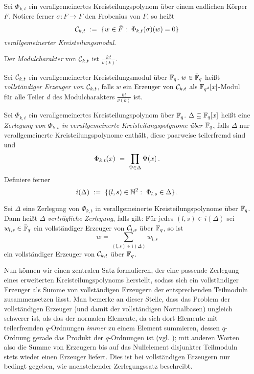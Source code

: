 \begin{definition}
  \label{def:verallgemeinerter_kreisteilungsmodul}
  Sei $\Phi_{k,t}$ ein verallgemeinertes Kreisteilungspolynom über einem
  endlichen Körper $F$. Notiere ferner $\sigma: \bar F\to \bar F$ 
  den Frobenius von $F$, so heißt
  \[ \mathcal{C}_{k,t} \ :=\  \{ w \in \bar F:\ \Phi_{k,t}(\sigma)(w) = 0 \}\]
  \emph{verallgemeinerter Kreisteilungsmodul}.

  Der \emph{Modulcharakter} von $\mathcal{C}_{k,t}$ ist $\frac{k\,t}{\nu(k)}$.
\end{definition}

\begin{definition}
  \label{def:vollst_erzeuger}
  Sei $\mathcal{C}_{k,t}$ ein verallgemeinerter Kreisteilungsmodul über $\mathbb{F}_q$.
  $w \in \bar {\mathbb{F}}_q$ heißt 
  \emph{vollständiger Erzeuger von $\mathcal{C}_{k,t}$}, falls
  $w$ ein Erzeuger von $\mathcal{C}_{k,t}$ als $\mathbb{F}_{q^d}[x]$-Modul 
  für alle Teiler $d$ des Modulcharakters $\frac{kt}{\nu(k)}$ ist.
\end{definition}

\begin{definition}
  Sei $\Phi_{k,t}$ ein verallgemeinertes Kreisteilungspolynom über $\mathbb{F}_q$.
  $\Delta \subseteq \mathbb{F}_q[x]$ heißt eine 
  \emph{Zerlegung von $\Phi_{k,t}$ in verallgemeinerte Kreisteilungspolynome
  über $\mathbb{F}_q$}, 
  falls $\Delta$ nur verallgemeinerte Kreisteilungspolynome enthält, diese
  paarweise teilerfremd sind und
  \[ \Phi_{k,t}(x) \ =\  \prod_{\Psi \in \Delta} \Psi(x)\,. \]
  Definiere ferner
  \[ i(\Delta) \speq{:=} \{ (l,s) \in \N^2:\ 
    \Phi_{l,s} \in \Delta\}\,.\]
\end{definition}


\begin{definition}
  \label{def:vertraeglich}
  Sei $\Delta$ eine Zerlegung von $\Phi_{k,t}$ in verallgemeinerte
  Kreisteilungspolynome über $\mathbb{F}_q$.
  Dann heißt $\Delta$ 
  \emph{verträgliche Zerlegung}, falls gilt: Für jedes 
  $(l,s) \in i(\Delta)$ sei
  $w_{l,s} \in \bar {\mathbb{F}}_q$ ein vollständiger Erzeuger von 
  $\mathcal{C}_{l,s}$ über $\mathbb{F}_q$,
  so ist 
  \[ w = \sum_{(l,s) \in i(\Delta)} w_{l,s} \]
  ein vollständiger Erzeuger von $\mathcal{C}_{k,t}$ über $\mathbb{F}_q$.
\end{definition}


Nun können wir einen zentralen Satz formulieren, der eine passende
Zerlegung eines erweiterten Kreisteilungspolynoms herstellt, sodass sich ein
vollständiger Erzeuger als Summe von vollständigen Erzeugern der entsprechenden
Teilmoduln zusammensetzen lässt. Man bemerke an dieser Stelle, dass das Problem
der vollständigen Erzeuger (und damit der vollständigen Normalbasen) ungleich
schwerer ist, als das der normalen Elemente, da sich dort Elemente 
mit teilerfremden $q$-Ordnungen \emph{immer} zu einem Element summieren, dessen
$q$-Ordnung gerade das Produkt der $q$-Ordnungen ist 
(vgl. ); mit anderen Worten 
also die Summe von Erzeugern bis auf das Nullelement disjunkter 
Teilmoduln stets wieder einen Erzeuger
liefert. Dies ist bei vollständigen Erzeugern nur bedingt gegeben, wie
nachstehender Zerlegungssatz beschreibt.

